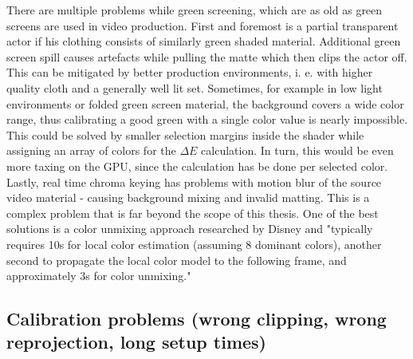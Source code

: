 There are multiple problems while green screening, which are as old as green 
screens are used in video production. First and foremost is a partial 
transparent actor if his clothing consists of similarly green shaded material.
\newline
Additional green screen spill causes artefacts while pulling the matte which 
then clips the actor off. This can be mitigated by better production 
environments, i. e. with higher quality cloth and a generally well lit set. 
\newline
Sometimes, for example in low light environments or folded green screen 
material, the background covers a wide color range, thus calibrating a good 
green with a single color value is nearly impossible. This could be solved by 
smaller selection margins inside the shader while assigning an array of colors 
for the $\Delta E$ calculation. In turn, this would be even more taxing on the 
GPU, since the calculation has be done per selected color.
\newline
Lastly, real time chroma keying has problems with motion blur of the source 
video material - causing background mixing and invalid matting. This is a 
complex problem that is far beyond the scope of this thesis. One of the best 
solutions is a color unmixing approach researched by Disney and "typically 
requires 10s for local color estimation (assuming 8 dominant colors), another 
second to propagate the local color model to the following frame, and 
approximately 3s for color unmixing." \cite{disney:unmixing:2017}

\subsection{Calibration problems (wrong clipping, wrong reprojection, long 
setup times)}

